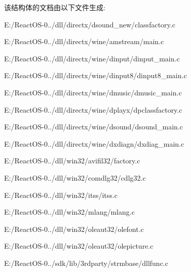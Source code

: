 该结构体的文档由以下文件生成\+:\begin{DoxyCompactItemize}
\item 
E\+:/\+React\+O\+S-\/0../dll/directx/dsound\+\_\+new/classfactory.\+c\item 
E\+:/\+React\+O\+S-\/0../dll/directx/wine/amstream/main.\+c\item 
E\+:/\+React\+O\+S-\/0../dll/directx/wine/dinput/dinput\+\_\+main.\+c\item 
E\+:/\+React\+O\+S-\/0../dll/directx/wine/dinput8/dinput8\+\_\+main.\+c\item 
E\+:/\+React\+O\+S-\/0../dll/directx/wine/dmusic/dmusic\+\_\+main.\+c\item 
E\+:/\+React\+O\+S-\/0../dll/directx/wine/dplayx/dpclassfactory.\+c\item 
E\+:/\+React\+O\+S-\/0../dll/directx/wine/dsound/dsound\+\_\+main.\+c\item 
E\+:/\+React\+O\+S-\/0../dll/directx/wine/dxdiagn/dxdiag\+\_\+main.\+c\item 
E\+:/\+React\+O\+S-\/0../dll/win32/avifil32/factory.\+c\item 
E\+:/\+React\+O\+S-\/0../dll/win32/comdlg32/cdlg32.\+c\item 
E\+:/\+React\+O\+S-\/0../dll/win32/itss/itss.\+c\item 
E\+:/\+React\+O\+S-\/0../dll/win32/mlang/mlang.\+c\item 
E\+:/\+React\+O\+S-\/0../dll/win32/oleaut32/olefont.\+c\item 
E\+:/\+React\+O\+S-\/0../dll/win32/oleaut32/olepicture.\+c\item 
E\+:/\+React\+O\+S-\/0../sdk/lib/3rdparty/strmbase/dllfunc.\+c\end{DoxyCompactItemize}
